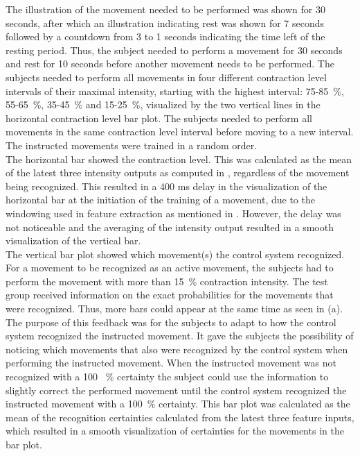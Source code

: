 The illustration of the movement needed to be performed was shown for 30 seconds, after which an illustration indicating rest was shown for 7 seconds followed by a countdown from 3 to 1 seconds indicating the time left of the resting period. Thus, the subject needed to perform a movement for 30 seconds and rest for 10 seconds before another movement needs to be performed. The subjects needed to perform all movements in four different contraction level intervals of their maximal intensity, starting with the highest interval: 75-85~\%, 55-65~\%, 35-45~\% and 15-25~\%, visualized by the two vertical lines in the horizontal contraction level bar plot. The subjects needed to perform all movements in the same contraction level interval before moving to a new interval. The instructed movements were trained in a random order. \\
The horizontal bar showed the contraction level. This was calculated as the mean of the latest three intensity outputs as computed in , regardless of the movement being recognized. This resulted in a 400 ms delay in the visualization of the horizontal bar at the initiation of the training of a movement, due to the windowing used in feature extraction as mentioned in . However, the delay was not noticeable and the averaging of the intensity output resulted in a smooth visualization of the vertical bar. \\
The vertical bar plot showed which movement(s) the control system recognized. For a movement to be recognized as an active movement, the subjects had to perform the movement with more than 15~\% contraction intensity. The test group received information on the exact probabilities for the movements that were recognized. Thus, more bars could appear at the same time as seen in  (a). The purpose of this feedback was for the subjects to adapt to how the control system recognized the instructed movement. It gave the subjects the possibility of noticing which movements that also were recognized by the control system when performing the instructed movement. When the instructed movement was not recognized with a 100 ~\% certainty the subject could use the information to slightly correct the performed movement until the control system recognized the instructed movement with a 100~\% certainty. This bar plot was calculated as the mean of the recognition certainties calculated from the latest three feature inputs, which resulted in a smooth visualization of certainties for the movements in the bar plot. \\
